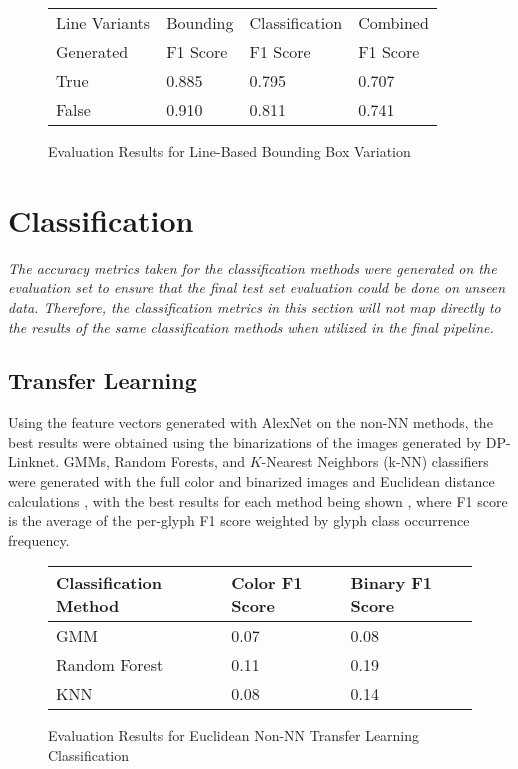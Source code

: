 \begin{figure}[H]
    \caption{Evaluation Results for Line-Based Bounding Box Variation}
    \label{fig:lineVariants}
    \begin{center}
      \begin{tabular}{ | l | l | l | l | }
          \hline
          Line Variants & Bounding & Classification & Combined \\
          Generated & F1 Score & F1 Score & F1 Score \\
          \hline
          True & 0.885 & 0.795 & 0.707 \\
          False & 0.910 &	0.811 &	0.741 \\
          \hline
      \end{tabular}
    \end{center}
\end{figure}

\section{Classification}

\textit{The accuracy metrics taken for the classification methods were generated on the evaluation set to ensure that the final test set evaluation could be done on unseen data. Therefore, the classification metrics in this section will not map directly to the results of the same classification methods when utilized in the final pipeline.}

\subsection{Transfer Learning}

Using the feature vectors generated with AlexNet on the non-NN methods, the best results were obtained using the binarizations of the images generated by DP-Linknet. GMMs, Random Forests, and $K$-Nearest Neighbors (k-NN) classifiers were generated with the full color and binarized images and Euclidean distance calculations , with the best results for each method being shown , where F1 score is the average of the per-glyph F1 score weighted by glyph class occurrence frequency.

\begin{figure}[H]
    \caption{Evaluation Results for Euclidean Non-NN Transfer Learning Classification}
    \label{fig:classificationEuclideanNonNN}
    \centering
    \begin{tabular}{ | l | l | l | }
        \hline
        Classification Method & Color F1 Score & Binary F1 Score \\
        \hline
        GMM & 0.07 & 0.08 \\
        Random Forest & 0.11 & 0.19 \\
        KNN & 0.08 & 0.14 \\
        \hline
    \end{tabular}
\end{figure}

